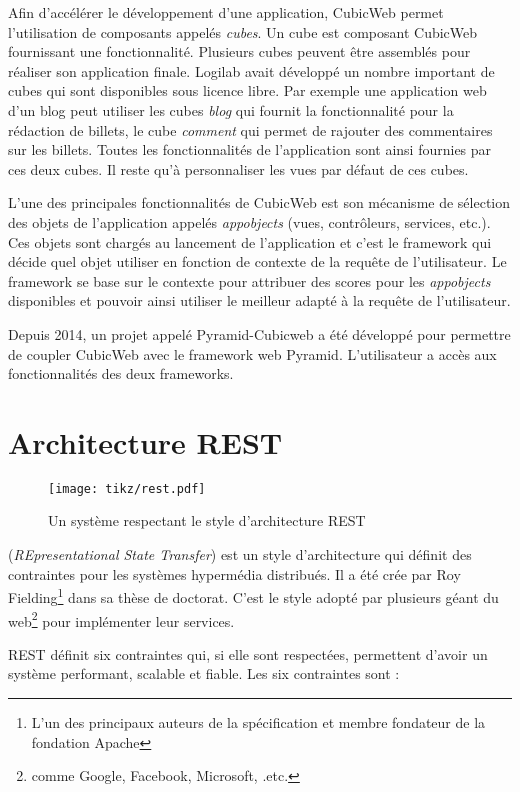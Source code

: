 Afin d'accélérer le développement d'une application, CubicWeb permet l'utilisation de composants appelés \emph{cubes}. Un cube est composant CubicWeb fournissant une fonctionnalité. Plusieurs cubes peuvent être assemblés pour réaliser son application finale. Logilab avait développé un nombre important de cubes qui sont disponibles sous licence libre. Par exemple une application web d'un blog peut utiliser les cubes \textit{blog} qui fournit la fonctionnalité pour la rédaction de billets, le cube \textit{comment} qui permet de rajouter des commentaires sur les billets. Toutes les fonctionnalités de l'application sont ainsi fournies par ces deux cubes. Il reste qu'à personnaliser les vues par défaut de ces cubes.

L'une des principales fonctionnalités de CubicWeb est son mécanisme de sélection des objets de l'application appelés \textit{appobjects} (vues, contrôleurs, services, etc.). Ces objets sont chargés au lancement de l'application et c'est le framework qui décide quel objet utiliser en fonction de contexte de la requête de l'utilisateur. Le framework se base sur le contexte pour attribuer des scores pour les \textit{appobjects} disponibles et pouvoir ainsi utiliser le meilleur adapté à la requête de l'utilisateur.  

Depuis 2014, un projet appelé Pyramid-Cubicweb a été développé pour permettre de coupler CubicWeb avec le framework web Pyramid. L'utilisateur a accès aux fonctionnalités des deux frameworks. 
 
\section{Architecture REST}
\begin{figure}
\centering
  \texttt{[image: tikz/rest.pdf]}
  \caption{Un système respectant le style d'architecture REST}
  \label{fig:rest}
\end{figure}
 (\textit{REpresentational State Transfer}) est un style d'architecture qui définit des contraintes pour les systèmes hypermédia distribués. Il a été crée par Roy Fielding\footnote{L’un des principaux auteurs de la spécification  et membre fondateur de la fondation Apache} dans sa thèse de doctorat. C'est le style adopté par plusieurs géant du web\footnote{comme Google, Facebook, Microsoft, .etc.} pour implémenter leur services. 

REST définit six contraintes qui, si elle sont respectées, permettent d'avoir un système performant, scalable et fiable. Les six contraintes sont :

